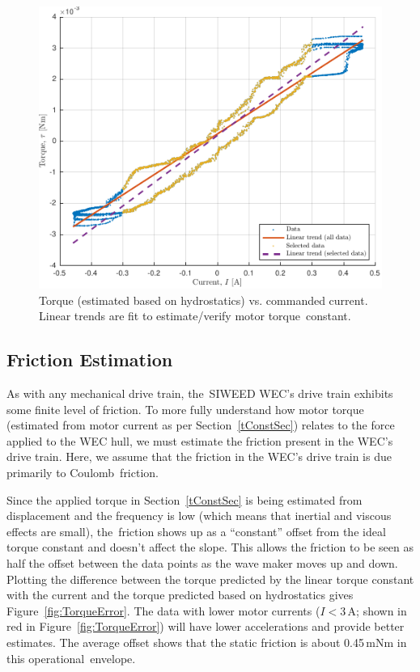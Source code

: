 \documentclass[hardware,article,submit,pdftex,moreauthors]{Definitions/mdpi}
\begin{document}
\begin{figure}[H]
  \centering
  \includegraphics[width=1\textwidth]{diagrams/findKT_3.pdf}
  \caption{Torque (estimated based on hydrostatics) vs. commanded current. Linear trends are fit to estimate/verify motor torque~constant.} %
  \label{fig:TorqueConstant}
\end{figure}
\unskip


\subsection{Friction Estimation}\label{friction}
As with any mechanical drive train, the~SIWEED WEC's drive train exhibits some finite level of friction.
To more fully understand how motor torque (estimated from motor current as per Section~\ref{tConstSec}) relates to the force applied to the WEC hull, we must estimate the friction present in the WEC's drive train.
Here, we assume that the friction in the WEC's drive train is due primarily to Coulomb~friction.

Since the applied torque in Section~\ref{tConstSec} is being estimated from displacement and the frequency is low (which means that inertial and viscous effects are small), the~friction shows up as a ``constant'' offset from the ideal torque constant and doesn't affect the slope.
This allows the friction to be seen as half the offset between the data points as the wave maker moves up and down.
Plotting the difference between the torque predicted by the linear torque constant with the current and the torque predicted based on hydrostatics gives Figure~\ref{fig:TorqueError}.
The data with lower motor currents ($I < 3$\,A; shown in red in Figure~\ref{fig:TorqueError}) will have lower accelerations and provide better estimates.
The average offset shows that the static friction is about 0.45\,mNm in this operational~envelope.
\end{document}
